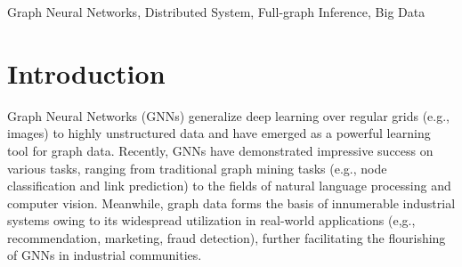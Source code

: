 \documentclass[conference]{IEEEtran}
\begin{document}
\begin{IEEEkeywords}
Graph Neural Networks, Distributed System, Full-graph Inference, Big Data 
\end{IEEEkeywords}

\section{Introduction}
Graph Neural Networks (GNNs) generalize deep learning over regular grids (e.g., images) to highly unstructured data and have emerged as a powerful learning tool for graph data.
Recently, GNNs have demonstrated impressive success on various tasks, ranging from traditional graph mining tasks (e.g., node classification\cite{b1,b2,b3,b4} and link prediction\cite{b5,b6}) to the fields of natural language processing\cite{b7} and computer vision\cite{b8}.
Meanwhile, graph data forms the basis of innumerable industrial systems owing to its widespread utilization in real-world applications (e,g., recommendation\cite{b9,b10,ab11,ab12,ab13}, marketing\cite{b11,ab15}, fraud detection\cite{b12, ab16}), further facilitating the flourishing of GNNs in industrial communities.
\end{document}

